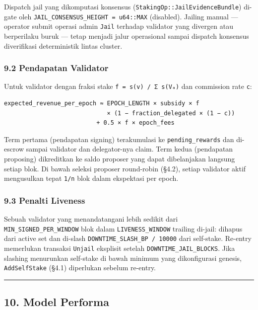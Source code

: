 \documentclass[11pt,a4paper]{article}
\begin{document}
Dispatch jail yang dikomputasi konsensus (\texttt{StakingOp::JailEvidenceBundle}) di-gate oleh \texttt{JAIL\_CONSENSUS\_HEIGHT\ =\ u64::MAX} (disabled). Jailing manual --- operator submit operasi admin \texttt{Jail} terhadap validator yang divergen atau berperilaku buruk --- tetap menjadi jalur operasional sampai dispatch konsensus diverifikasi deterministik lintas cluster.

\hypertarget{pendapatan-validator}{%
\subsubsection{9.2 Pendapatan Validator}\label{pendapatan-validator}}

Untuk validator dengan fraksi stake \texttt{f\ =\ s(v)\ /\ Σ\ s(Vₐ)} dan commission rate \texttt{c}:

\begin{verbatim}
expected_revenue_per_epoch ≈ EPOCH_LENGTH × subsidy × f
                             × (1 − fraction_delegated × (1 − c))
                          + 0.5 × f × epoch_fees
\end{verbatim}

Term pertama (pendapatan signing) terakumulasi ke \texttt{pending\_rewards} dan di-escrow sampai validator dan delegator-nya claim. Term kedua (pendapatan proposing) dikreditkan ke saldo proposer yang dapat dibelanjakan langsung setiap blok. Di bawah seleksi proposer round-robin (§4.2), setiap validator aktif mengusulkan tepat \texttt{1/n} blok dalam ekspektasi per epoch.

\hypertarget{penalti-liveness}{%
\subsubsection{9.3 Penalti Liveness}\label{penalti-liveness}}

Sebuah validator yang menandatangani lebih sedikit dari \texttt{MIN\_SIGNED\_PER\_WINDOW} blok dalam \texttt{LIVENESS\_WINDOW} trailing di-jail: dihapus dari active set dan di-slash \texttt{DOWNTIME\_SLASH\_BP\ /\ 10000} dari self-stake. Re-entry memerlukan transaksi \texttt{Unjail} eksplisit setelah \texttt{DOWNTIME\_JAIL\_BLOCKS}. Jika slashing menurunkan self-stake di bawah minimum yang dikonfigurasi genesis, \texttt{AddSelfStake} (§4.1) diperlukan sebelum re-entry.

\begin{center}\rule{0.5\linewidth}{0.5pt}\end{center}

\hypertarget{model-performa}{%
\subsection{10. Model Performa}\label{model-performa}}
\end{document}
